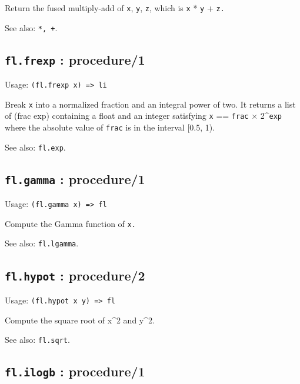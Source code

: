 \documentclass[
]{article}
\newcommand{\passthrough}[1]{#1}
\begin{document}
Return the fused multiply-add of \passthrough{\lstinline!x!},
\passthrough{\lstinline!y!}, \passthrough{\lstinline!z!}, which is
\passthrough{\lstinline!x!} * \passthrough{\lstinline!y!} +
\passthrough{\lstinline!z.!}

See also: \passthrough{\lstinline!*, +!}.

\hypertarget{fl.frexp-procedure1-1}{%
\subsection{\texorpdfstring{\texttt{fl.frexp} :
procedure/1}{fl.frexp : procedure/1}}\label{fl.frexp-procedure1-1}}

Usage: \passthrough{\lstinline!(fl.frexp x) => li!}

Break \passthrough{\lstinline!x!} into a normalized fraction and an
integral power of two. It returns a list of (frac exp) containing a
float and an integer satisfying \passthrough{\lstinline!x!} ==
\passthrough{\lstinline!frac!} × 2\^{}\passthrough{\lstinline!exp!}
where the absolute value of \passthrough{\lstinline!frac!} is in the
interval {[}0.5, 1).

See also: \passthrough{\lstinline!fl.exp!}.

\hypertarget{fl.gamma-procedure1-1}{%
\subsection{\texorpdfstring{\texttt{fl.gamma} :
procedure/1}{fl.gamma : procedure/1}}\label{fl.gamma-procedure1-1}}

Usage: \passthrough{\lstinline!(fl.gamma x) => fl!}

Compute the Gamma function of \passthrough{\lstinline!x.!}

See also: \passthrough{\lstinline!fl.lgamma!}.

\hypertarget{fl.hypot-procedure2-1}{%
\subsection{\texorpdfstring{\texttt{fl.hypot} :
procedure/2}{fl.hypot : procedure/2}}\label{fl.hypot-procedure2-1}}

Usage: \passthrough{\lstinline!(fl.hypot x y) => fl!}

Compute the square root of x\^{}2 and y\^{}2.

See also: \passthrough{\lstinline!fl.sqrt!}.

\hypertarget{fl.ilogb-procedure1-1}{%
\subsection{\texorpdfstring{\texttt{fl.ilogb} :
procedure/1}{fl.ilogb : procedure/1}}\label{fl.ilogb-procedure1-1}}
\end{document}
